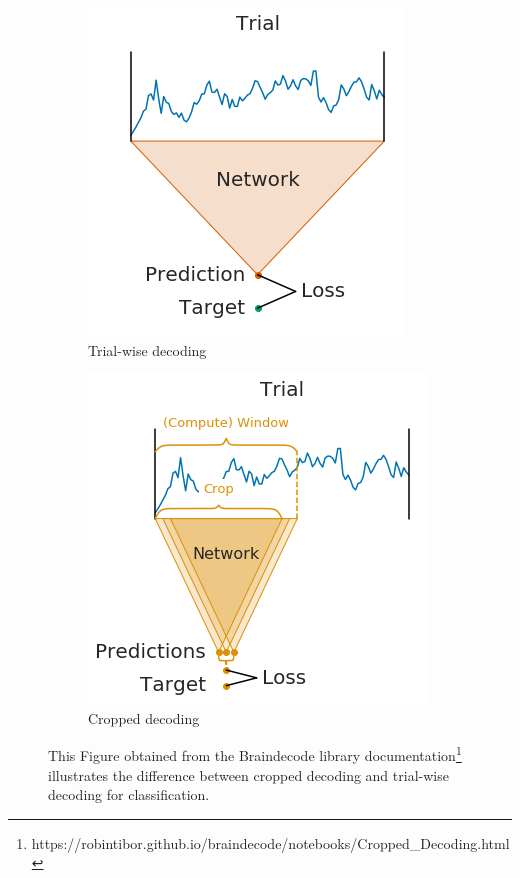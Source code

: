 \begin{figure}[!htpb]
\centering
\begin{subfigure}[b]{0.4\textwidth}
   \includegraphics[width=0.9\linewidth]{img/ch3/trialwise-explanation}
   \caption{Trial-wise decoding}
   \label{fig:trial-wise-decoding-trial-wise}
\end{subfigure}

\begin{subfigure}[b]{0.55\textwidth}
   \includegraphics[width=0.9\linewidth]{img/ch3/trialwise-explanation2}
   \caption{Cropped decoding}
   \label{fig:trial-wise-decoding-cropped}
\end{subfigure}
\caption[Trial-wise vs. cropped decoding]{This Figure obtained from the Braindecode library documentation\footnote{https://robintibor.github.io/braindecode/notebooks/Cropped\_Decoding.html} illustrates the difference between cropped decoding and trial-wise decoding for classification.}
\label{fig:trial-wise-decoding} 
\end{figure}

